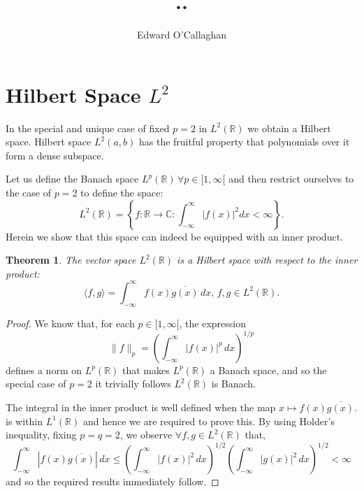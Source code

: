 \documentclass{article}
\title{..}
\author{Edward O'Callaghan}
\newtheorem{thm}{Theorem}[section]
\begin{document}
\maketitle

\section{Hilbert Space $L^2$}

In the special and unique case of fixed $p=2$ in $L^2(\mathbb{R})$ we obtain a Hilbert
space. Hilbert space $L^2(a,b)$ has the fruitful property that polynomials over
it form a dense subspace.

Let us define the Banach space $L^p(\mathbb{R})\, \forall p \in [1, \infty[$ and then
restrict ourselves to the case of $p=2$ to define the space:
\[
 L^2(\mathbb{R}) = \left\{ f : \mathbb{R} \rightarrow \mathbb{C} : \int_{-\infty}^{\infty} \left| f(x) \right|^2 dx < \infty \right\}.
\]
Herein we show that this space can indeed be equipped with an inner product.

\begin{thm}
The vector space $L^2(\mathbb{R})$ is a Hilbert space with respect to the inner product:
  \[
    \langle f,g \rangle = \int_{-\infty}^{\infty} f(x) \overline{g(x)} \, dx, \, f,g \in L^2(\mathbb{R}).
  \]
\end{thm}

\begin{proof}
We know that, for each $p\in[1,\infty[$, the expression
  \[
    \|f\|_p = \left( \int_{-\infty}^{\infty} |f(x)|^p \, dx \right)^{1/p}
  \]
defines a norm on $L^p(\mathbb{R})$ that makes $L^p(\mathbb{R})$ a Banach
space, and so the special case of $p=2$ it trivially follows $L^2(\mathbb{R})$
is Banach.

The integral in the inner product is well defined when the map $x \mapsto f(x)
\overline{g(x)}$. is within $L^1(\mathbb{R})$ and hence we are required to prove
this. By using Holder's inequality, fixing $p=q=2$, we observe $\forall f,g \in
L^2(\mathbb{R})$ that,
\[
  \int_{-\infty}^{\infty} |f(x) \overline{g(x)}| \, dx \leq
  \left( \int_{-\infty}^{\infty} |f(x)|^2 \, dx \right)^{1/2}
  \left( \int_{-\infty}^{\infty} |g(x)|^2 \, dx \right)^{1/2} < \infty
\]
and so the required results immediately follow.
\end{proof}
\end{document}
